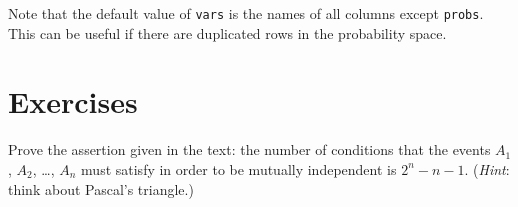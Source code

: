 Note that the default value of \texttt{vars} is the names of all columns
except \texttt{probs}. This can be useful if there are duplicated rows in the
probability space.

\newpage{}

\section{Exercises}
\label{sec-4-10}

\setcounter{thm}{0}

\begin{xca}
\label{xca-numb-cond-indep} Prove the assertion given in the text: the
number of conditions that the events \(A_{1}\), \(A_{2}\), \ldots{},
\(A_{n}\) must satisfy in order to be mutually independent is
\(2^{n} - n - 1\). (\emph{Hint}: think about Pascal's triangle.)
\end{xca}
